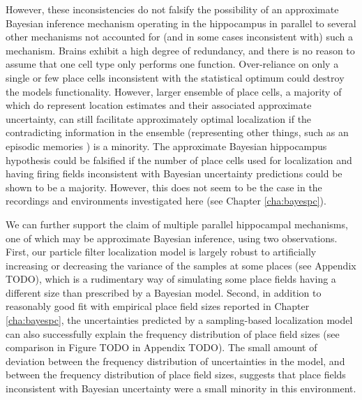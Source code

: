 However, these inconsistencies do not falsify the possibility of an approximate Bayesian inference mechanism operating in the hippocampus in parallel to several other mechanisms not accounted for (and in some cases inconsistent with) such a mechanism. Brains exhibit a high degree of redundancy, and there is no reason to assume that one cell type only performs one function. Over-reliance on only a single or few place cells inconsistent with the statistical optimum could destroy the models functionality. However, larger ensemble of place cells, a majority of which do represent location estimates and their associated approximate uncertainty, can still facilitate approximately optimal localization if the contradicting information in the ensemble (representing other things, such as an episodic memories \citep{tulving1998episodic}) is a minority. The approximate Bayesian hippocampus hypothesis could be falsified if the number of place cells used for localization and having firing fields inconsistent with Bayesian uncertainty predictions could be shown to be a majority. However, this does not seem to be the case in the recordings and environments investigated here (see Chapter \ref{cha:bayespc}).

We can further support the claim of multiple parallel hippocampal mechanisms, one of which may be approximate Bayesian inference, using two observations. First, our particle filter localization model is largely robust to artificially increasing or decreasing the variance of the samples at some places (see Appendix TODO), which is a rudimentary way of simulating some place fields having a different size than prescribed by a Bayesian model. Second, in addition to reasonably good fit with empirical place field sizes reported in Chapter \ref{cha:bayespc}, the uncertainties predicted by a sampling-based localization model can also successfully explain the frequency distribution of place field sizes (see comparison in Figure TODO in Appendix TODO). The small amount of deviation between the frequency distribution of uncertainties in the model, and between the frequency distribution of place field sizes, suggests that place fields inconsistent with Bayesian uncertainty were a small minority in this environment. 



